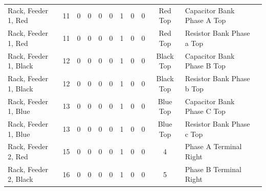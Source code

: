 \begin{table}[!htp]
{\begin{tabular}{lcccccccccll}
			Rack, Feeder 1, Red            & 11                      & 0                                           & 0                                          & 0           & 0           & 1            & 0                & 0 & Red Top                      & Capacitor Bank Phase A Top       &                \\
			Rack, Feeder 1, Red            & 11                      & 0                                           & 0                                          & 0           & 0           & 1            & 0                & 0 & Red Top                      & Resistor Bank Phase a Top        &                \\
			Rack, Feeder 1, Black          & 12                      & 0                                           & 0                                          & 0           & 0           & 1            & 0                & 0 & Black Top                    & Capacitor Bank Phase B Top       &                \\
			Rack, Feeder 1, Black          & 12                      & 0                                           & 0                                          & 0           & 0           & 1            & 0                & 0 & Black Top                    & Resistor Bank Phase b Top        &                \\
			Rack, Feeder 1, Blue           & 13                      & 0                                           & 0                                          & 0           & 0           & 1            & 0                & 0 & Blue Top                     & Capacitor Bank Phase C Top       &                \\
			Rack, Feeder 1, Blue           & 13                      & 0                                           & 0                                          & 0           & 0           & 1            & 0                & 0 & Blue Top                     & Resistor Bank Phase c Top        &                \\
			Rack, Feeder 2, Red            & 15                      & 0                                           & 0                                          & 0           & 0           & 1            & 0                & 0 & 4                            & Phase A Terminal Right           &                \\
			Rack, Feeder 2, Black          & 16                      & 0                                           & 0                                          & 0           & 0           & 1            & 0                & 0 & 5                            & Phase B Terminal Right           &                \\

\end{tabular}}
\end{table}
